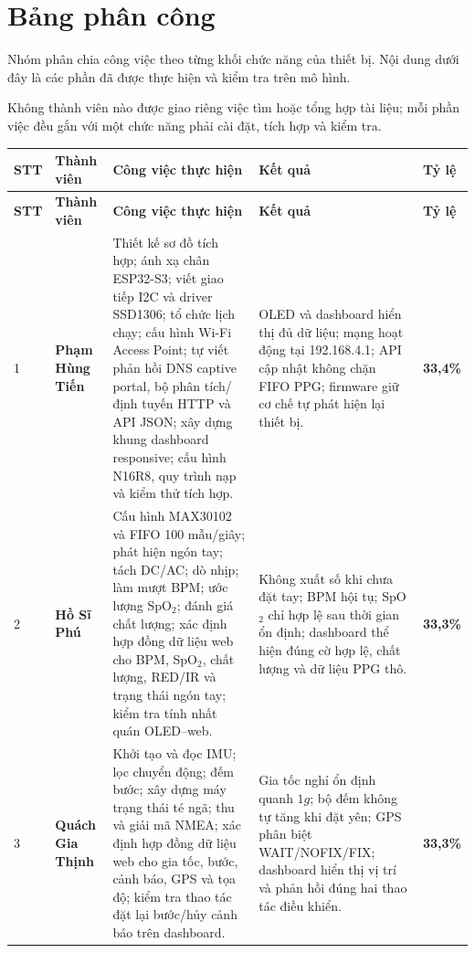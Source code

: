 \documentclass[12pt]{article}
\begin{document}

\section{Bảng phân công}

Nhóm phân chia công việc theo từng khối chức năng của thiết bị. Nội dung dưới đây là các phần đã được thực hiện và kiểm tra trên mô hình.

Không thành viên nào được giao riêng việc tìm hoặc tổng hợp tài liệu; mỗi phần việc đều gắn với một chức năng phải cài đặt, tích hợp và kiểm tra.

\small
\begin{longtable}{C{0.8cm} L{2.75cm} L{4.85cm} L{3.75cm} C{1.15cm}}
\toprule
\textbf{STT} & \textbf{Thành viên} & \textbf{Công việc thực hiện} & \textbf{Kết quả} & \textbf{Tỷ lệ}\\
\midrule
\endfirsthead
\toprule
\textbf{STT} & \textbf{Thành viên} & \textbf{Công việc thực hiện} & \textbf{Kết quả} & \textbf{Tỷ lệ}\\
\midrule
{} & \textbf{Phạm Hùng Tiến} &
Thiết kế sơ đồ tích hợp; ánh xạ chân ESP32-S3; viết giao tiếp I2C và driver SSD1306; tổ chức lịch chạy; cấu hình Wi-Fi Access Point; tự viết phản hồi DNS captive portal, bộ phân tích/định tuyến HTTP và API JSON; xây dựng khung dashboard responsive; cấu hình N16R8, quy trình nạp và kiểm thử tích hợp. &
OLED và dashboard hiển thị đủ dữ liệu; mạng  hoạt động tại 192.168.4.1; API cập nhật không chặn FIFO PPG; firmware giữ cơ chế tự phát hiện lại thiết bị. & \textbf{33,4\%}\\
 & \textbf{Hồ Sĩ Phú} &
Cấu hình MAX30102 và FIFO 100 mẫu/giây; phát hiện ngón tay; tách DC/AC; dò nhịp; làm mượt BPM; ước lượng SpO$_2$; đánh giá chất lượng; xác định hợp đồng dữ liệu web cho BPM, SpO$_2$, chất lượng, RED/IR và trạng thái ngón tay; kiểm tra tính nhất quán OLED--web. &
Không xuất số khi chưa đặt tay; BPM hội tụ; SpO$_2$ chỉ hợp lệ sau thời gian ổn định; dashboard thể hiện đúng cờ hợp lệ, chất lượng và dữ liệu PPG thô. & \textbf{33,3\%}\\
 & \textbf{Quách Gia Thịnh} &
Khởi tạo và đọc IMU; lọc chuyển động; đếm bước; xây dựng máy trạng thái té ngã; thu và giải mã NMEA; xác định hợp đồng dữ liệu web cho gia tốc, bước, cảnh báo, GPS và tọa độ; kiểm tra thao tác đặt lại bước/hủy cảnh báo trên dashboard. &
Gia tốc nghỉ ổn định quanh $1g$; bộ đếm không tự tăng khi đặt yên; GPS phân biệt WAIT/NOFIX/FIX; dashboard hiển thị vị trí và phản hồi đúng hai thao tác điều khiển. & \textbf{33,3\%}\\
\bottomrule
\end{longtable}
\normalsize
\end{document}
